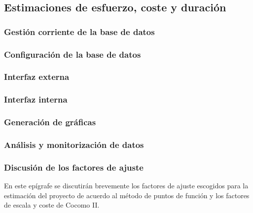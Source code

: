 \documentclass[11pt, a4paper, twoside, titlepage]{article}
\begin{document}
		\subsection{Estimaciones de esfuerzo, coste y duración}

			\subsubsection{Gestión corriente de la base de datos} \label{estimac:gestioncorriente}
				
			
			\subsubsection{Configuración de la base de datos} \label{estimac:configuracion}
					

			\subsubsection{Interfaz externa} \label{estimac:iexterna}
					
			
			\subsubsection{Interfaz interna} \label{estimac:iinterna}
					
			
			\subsubsection{Generación de gráficas} \label{estimac:graficas}
					
			
			\subsubsection{Análisis y monitorización de datos} \label{estimac:analisis}
				
				
			\subsubsection{Discusión de los factores de ajuste} \label{estimac:factores}
				En este epígrafe se discutirán brevemente los factores de ajuste escogidos para la estimación del proyecto de acuerdo al método de puntos de función y los factores de escala y coste de Cocomo II.
\end{document}
